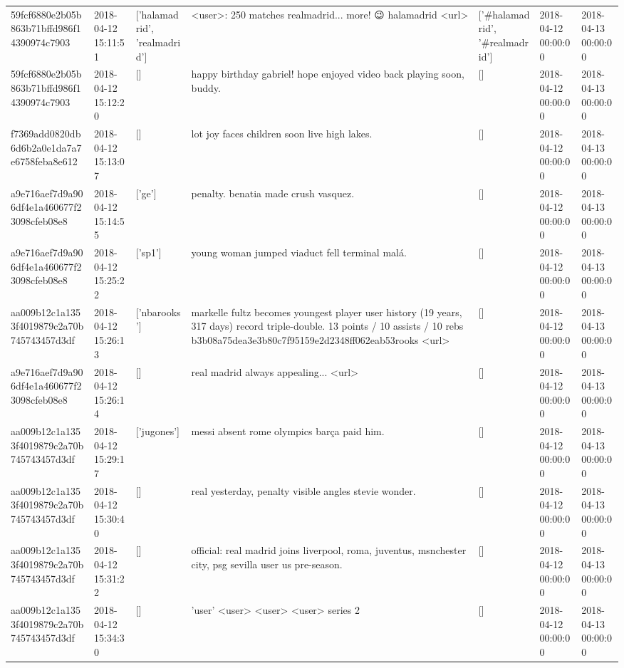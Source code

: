 \begin{tabular}{lllllll}
59fcf6880e2b05b863b71bffd986f14390974c7903 & 2018-04-12 15:11:51 & ['halamadrid', 'realmadrid'] & <user>: 250 matches realmadrid... more! 😉 halamadrid <url> & ['#halamadrid', '#realmadrid'] & 2018-04-12 00:00:00 & 2018-04-13 00:00:00 \\
59fcf6880e2b05b863b71bffd986f14390974c7903 & 2018-04-12 15:12:20 & [] & happy birthday gabriel! hope enjoyed video back playing soon, buddy. & [] & 2018-04-12 00:00:00 & 2018-04-13 00:00:00 \\
f7369add0820db6d6b2a0e1da7a7e6758feba8e612 & 2018-04-12 15:13:07 & [] & lot joy faces children soon live high lakes. & [] & 2018-04-12 00:00:00 & 2018-04-13 00:00:00 \\
a9e716aef7d9a906df4e1a460677f23098cfeb08e8 & 2018-04-12 15:14:55 & ['ge'] & penalty. benatia made crush vasquez. & [] & 2018-04-12 00:00:00 & 2018-04-13 00:00:00 \\
a9e716aef7d9a906df4e1a460677f23098cfeb08e8 & 2018-04-12 15:25:22 & ['sp1'] & young woman jumped viaduct fell terminal malá. & [] & 2018-04-12 00:00:00 & 2018-04-13 00:00:00 \\
aa009b12c1a1353f4019879c2a70b745743457d3df & 2018-04-12 15:26:13 & ['nbarooks'] & markelle fultz becomes youngest player user history (19 years, 317 days) record triple-double. 13 points / 10 assists / 10 rebs b3b08a75dea3e3b80c7f95159e2d2348ff062eab53rooks <url> & [] & 2018-04-12 00:00:00 & 2018-04-13 00:00:00 \\
a9e716aef7d9a906df4e1a460677f23098cfeb08e8 & 2018-04-12 15:26:14 & [] & real madrid always appealing... <url> & [] & 2018-04-12 00:00:00 & 2018-04-13 00:00:00 \\
aa009b12c1a1353f4019879c2a70b745743457d3df & 2018-04-12 15:29:17 & ['jugones'] & messi absent rome olympics barça paid him. & [] & 2018-04-12 00:00:00 & 2018-04-13 00:00:00 \\
aa009b12c1a1353f4019879c2a70b745743457d3df & 2018-04-12 15:30:40 & [] & real yesterday, penalty visible angles stevie wonder. & [] & 2018-04-12 00:00:00 & 2018-04-13 00:00:00 \\
aa009b12c1a1353f4019879c2a70b745743457d3df & 2018-04-12 15:31:22 & [] & official: real madrid joins liverpool, roma, juventus, msnchester city, psg sevilla user us pre-season. & [] & 2018-04-12 00:00:00 & 2018-04-13 00:00:00 \\
aa009b12c1a1353f4019879c2a70b745743457d3df & 2018-04-12 15:34:30 & [] & 'user' <user> <user> <user> series 2 & [] & 2018-04-12 00:00:00 & 2018-04-13 00:00:00 \\

\end{tabular}
